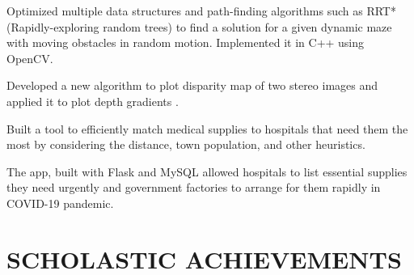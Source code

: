 \documentclass[]{deedy-resume-openfont}
\begin{document}
\begin{minipage}[t]{0.66\textwidth}
\begin{tightemize}
\item Optimized multiple data structures and path-finding algorithms such as RRT*(Rapidly-exploring random trees) to find a solution for a given dynamic maze with moving obstacles in random motion. Implemented it in C++ using OpenCV.
\item Developed a new algorithm to plot disparity map of two stereo images and applied it to plot depth gradients .
\end{tightemize}
\sectionsep
{}
\descript{}
\begin{tightemize}
\item Built a tool to efficiently match medical supplies to hospitals that need them the most by considering the distance, town population, and other heuristics.
\item The app, built with Flask and MySQL allowed hospitals to list essential supplies they need urgently and government factories to arrange for them rapidly in COVID-19 pandemic.
\end{tightemize}


\section{SCHOLASTIC ACHIEVEMENTS}


\end{minipage}
\end{document}
